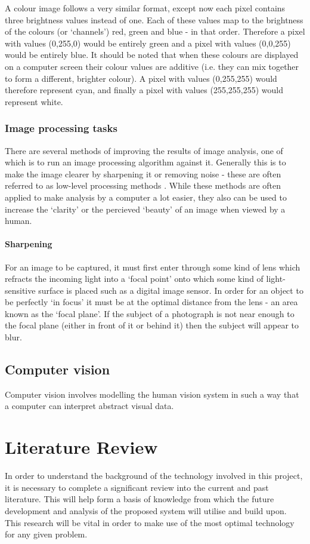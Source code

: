 \documentclass[a4paper,12pt]{report}
\begin{document}
     A colour image follows a very similar format, except now each pixel contains three brightness values instead of one. Each of these values map to the brightness of the colours (or ‘channels’) red, green and blue - in that order. Therefore a pixel with values (0,255,0) would be entirely green and a pixel with values (0,0,255) would be entirely blue. It should be noted that when these colours are displayed on a computer screen their colour values are additive (i.e. they can mix together to form a different, brighter colour). A pixel with values (0,255,255) would therefore represent cyan, and finally a pixel with values (255,255,255) would represent white.

   \subsection{Image processing tasks}
     There are several methods of improving the results of image analysis, one of which is to run an image processing algorithm against it. Generally this is to make the image clearer by sharpening it or removing noise - these are often referred to as low-level processing methods \citep{sonka2014image}. While these methods are often applied to make analysis by a computer a lot easier, they also can be used to increase the ‘clarity’ or the percieved ‘beauty’ of an image when viewed by a human.

     \subsubsection{Sharpening}
       For an image to be captured, it must first enter through some kind of lens which refracts the incoming light into a ‘focal point’ onto which some kind of light-sensitive surface is placed such as a digital image sensor. In order for an object to be perfectly ‘in focus’ it must be at the optimal distance from the lens - an area known as the ‘focal plane’. If the subject of a photograph is not near enough to the focal plane (either in front of it or behind it) then the subject will appear to blur.

  \section{Computer vision}
   Computer vision involves modelling the human vision system in such a way that a computer can interpret abstract visual data.

\chapter{Literature Review}
  In order to understand the background of the technology involved in this project, it is necessary to complete a significant review into the current and past literature. This will help form a basis of knowledge from which the future development and analysis of the proposed system will utilise and build upon. This research will be vital in order to make use of the most optimal technology for any given problem.
\end{document}

